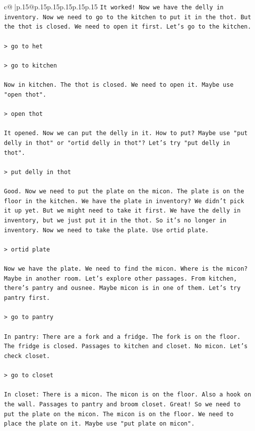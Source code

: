 \documentclass{article}
\begin{document}
{\begin{supertabular}{c@{$\;$}|p{.15\linewidth}@{}p{.15\linewidth}p{.15\linewidth}p{.15\linewidth}p{.15\linewidth}p{.15\linewidth}}
{{{\texttt{It worked! Now we have the delly in inventory. Now we need to go to the kitchen to put it in the thot. But the thot is closed. We need to open it first. Let's go to the kitchen.} \\
\\ 
\texttt{> go to het} \\
\\ 
\texttt{> go to kitchen} \\
\\ 
\texttt{Now in kitchen. The thot is closed. We need to open it. Maybe use "open thot".} \\
\\ 
\texttt{> open thot} \\
\\ 
\texttt{It opened. Now we can put the delly in it. How to put? Maybe use "put delly in thot" or "ortid delly in thot"? Let's try "put delly in thot".} \\
\\ 
\texttt{> put delly in thot} \\
\\ 
\texttt{Good. Now we need to put the plate on the micon. The plate is on the floor in the kitchen. We have the plate in inventory? We didn't pick it up yet. But we might need to take it first. We have the delly in inventory, but we just put it in the thot. So it's no longer in inventory. Now we need to take the plate. Use ortid plate.} \\
\\ 
\texttt{> ortid plate} \\
\\ 
\texttt{Now we have the plate. We need to find the micon. Where is the micon? Maybe in another room. Let's explore other passages. From kitchen, there's pantry and ousnee. Maybe micon is in one of them. Let's try pantry first.} \\
\\ 
\texttt{> go to pantry} \\
\\ 
\texttt{In pantry: There are a fork and a fridge. The fork is on the floor. The fridge is closed. Passages to kitchen and closet. No micon. Let's check closet.} \\
\\ 
\texttt{> go to closet} \\
\\ 
\texttt{In closet: There is a micon. The micon is on the floor. Also a hook on the wall. Passages to pantry and broom closet. Great! So we need to put the plate on the micon. The micon is on the floor. We need to place the plate on it. Maybe use "put plate on micon".} \\
}}}
\end{supertabular}}
\end{document}
